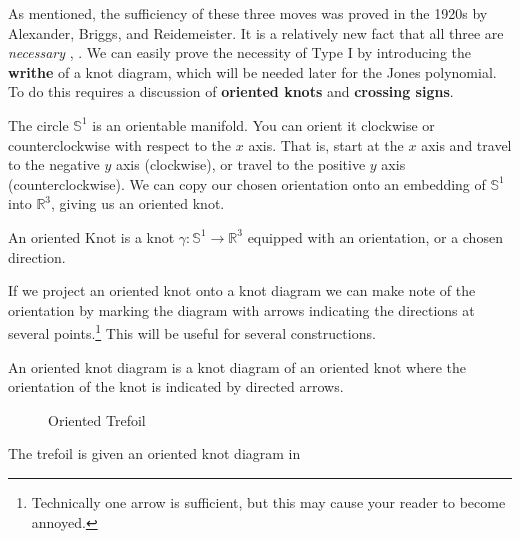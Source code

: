         \par\hfill\par
        As mentioned, the sufficiency of these three moves was proved in the
        1920s by Alexander, Briggs, and Reidemeister. It is a relatively new
        fact that all three are \textit{necessary}
        \cite{OstlundReidemeisterMoves2001},
        \cite{HaggeReidemeisterRequired2005}. We can easily prove the necessity
        of Type I by introducing the \textbf{writhe} of a knot diagram, which
        will be needed later for the Jones polynomial. To do this requires a
        discussion of \textbf{oriented knots} and \textbf{crossing signs}.
        \par\hfill\par
        The circle $\mathbb{S}^{1}$ is an orientable manifold. You can orient it
        clockwise or counterclockwise with respect to the $x$ axis. That is,
        start at the $x$ axis and travel to the negative $y$ axis
        (clockwise), or travel to the positive $y$ axis (counterclockwise).
        We can copy our chosen orientation onto an embedding of
        $\mathbb{S}^{1}$ into $\mathbb{R}^{3}$, giving us an oriented knot.
        \begin{definition}
            An oriented Knot is a knot
            $\gamma:\mathbb{S}^{1}\rightarrow\mathbb{R}^{3}$ equipped with an
            orientation, or a chosen direction.
        \end{definition}
        If we project an oriented knot onto a knot diagram we can make note of
        the orientation by marking the diagram with arrows indicating the
        directions at several points.\footnote{%
            Technically one arrow is sufficient, but this may cause your
            reader to become annoyed.
        }
        This will be useful for several constructions.
        \begin{definition}
            An oriented knot diagram is a knot diagram of an oriented knot
            where the orientation of the knot is indicated by directed arrows.
        \end{definition}
        \begin{figure}
            \centering
            \caption{Oriented Trefoil}
            \label{fig:trefoil_knot_oriented_001}
        \end{figure}
        The trefoil is given an oriented knot diagram in
